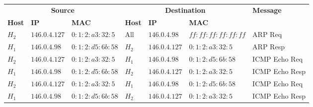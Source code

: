 \documentclass{report}
\begin{document}
\begin{center}
	\begin{tabular}{l l l | l l l | l }
		\multicolumn{3}{c}{\textbf{Source}} & \multicolumn{3}{c}{\textbf{Destination}} & \multirow{2}{*}{\textbf{Message}}                                                                        \\
		\textbf{Host}                       & \textbf{IP}                              & \textbf{MAC}                      & \textbf{Host} & \textbf{IP}   & \textbf{MAC}        &                \\
		$H_2$                               & $146.0.4.127$                            & $0:1:2:a3:32:5$                   & All           & $146.0.4.98$  & $ff:ff:ff:ff:ff:ff$ & ARP Req        \\
		$H_1$                               & $146.0.4.98$                             & $0:1:2:d5:6b:58$                  & $H_2$         & $146.0.4.127$ & $0:1:2:a3:32:5$     & ARP Resp       \\
		$H_2$                               & $146.0.4.127$                            & $0:1:2:a3:32:5$                   & $H_1$         & $146.0.4.98$  & $0:1:2:d5:6b:58$    & ICMP Echo Req  \\
		$H_1$                               & $146.0.4.98$                             & $0:1:2:d5:6b:58$                  & $H_2$         & $146.0.4.127$ & $0:1:2:a3:32:5$     & ICMP Echo Resp \\
		$H_2$                               & $146.0.4.127$                            & $0:1:2:a3:32:5$                   & $H_1$         & $146.0.4.98$  & $0:1:2:d5:6b:58$    & ICMP Echo Req  \\
		$H_1$                               & $146.0.4.98$                             & $0:1:2:d5:6b:58$                  & $H_2$         & $146.0.4.127$ & $0:1:2:a3:32:5$     & ICMP Echo Resp \\
	\end{tabular}
\end{center}

\end{document}
